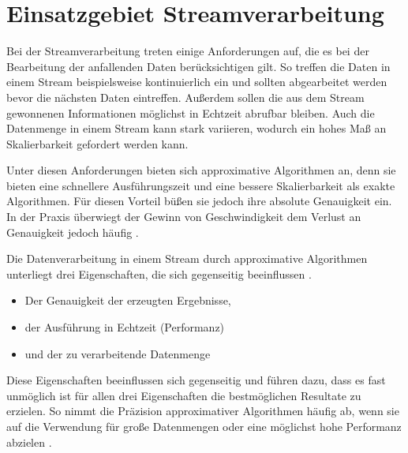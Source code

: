 \section{Einsatzgebiet Streamverarbeitung}
Bei der Streamverarbeitung treten einige Anforderungen auf, die es bei der Bearbeitung der anfallenden Daten berücksichtigen gilt. 
So treffen die Daten in einem Stream beispielsweise kontinuierlich ein und sollten abgearbeitet werden bevor die nächsten Daten eintreffen. 
Außerdem sollen die aus dem Stream gewonnenen Informationen möglichst in Echtzeit abrufbar bleiben.
Auch die Datenmenge in einem Stream kann stark variieren, wodurch ein hohes Maß an Skalierbarkeit gefordert werden kann.

Unter diesen Anforderungen bieten sich approximative Algorithmen an, denn sie bieten eine schnellere Ausführungszeit und eine bessere Skalierbarkeit als exakte Algorithmen. 
Für diesen Vorteil büßen sie jedoch ihre absolute Genauigkeit ein. 
In der Praxis überwiegt der Gewinn von Geschwindigkeit dem Verlust an Genauigkeit jedoch häufig \cite{Maas2019}. 

Die Datenverarbeitung in einem Stream durch approximative Algorithmen unterliegt drei Eigenschaften, die sich gegenseitig beeinflussen \cite{Maas2019}. 

\begin{itemize}
\item
Der Genauigkeit der erzeugten Ergebnisse,
\item
der Ausführung in Echtzeit (Performanz)
\item
und der zu verarbeitende Datenmenge
\end{itemize}

Diese Eigenschaften beeinflussen sich gegenseitig und führen dazu, dass es fast unmöglich ist für allen drei Eigenschaften die bestmöglichen Resultate zu erzielen.
So nimmt die Präzision approximativer Algorithmen häufig ab, wenn sie auf die Verwendung für große Datenmengen oder eine möglichst hohe Performanz abzielen \cite{Maas2019}.